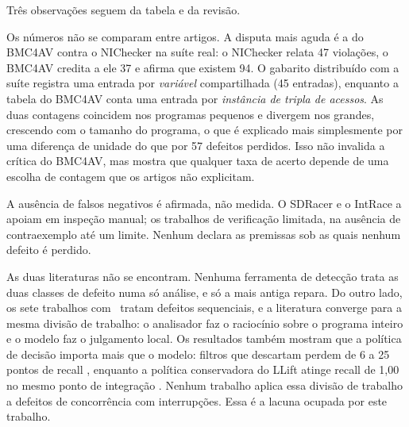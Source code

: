 Três observações seguem da tabela e da revisão.

Os números não se comparam entre artigos. A disputa mais aguda é a do
BMC4AV contra o NIChecker na suíte real: o NIChecker relata 47 violações, o
BMC4AV credita a ele 37 e afirma que existem 94. O gabarito
distribuído com a suíte registra uma entrada por \textit{variável} compartilhada
(45 entradas), enquanto a tabela do BMC4AV conta uma entrada por
\textit{instância de tripla de acessos}. As duas contagens coincidem nos
programas pequenos e divergem nos grandes, crescendo com o tamanho do programa, o que é explicado mais simplesmente por uma diferença de unidade do que
por 57 defeitos perdidos. Isso não invalida a crítica do BMC4AV, mas mostra que
qualquer taxa de acerto depende de uma escolha de contagem que os artigos não
explicitam.

A ausência de falsos negativos é afirmada, não medida. O SDRacer e o IntRace a apoiam em inspeção manual; os trabalhos de verificação limitada, na ausência de
contraexemplo até um limite. Nenhum declara as premissas sob as quais nenhum
defeito é perdido.

As duas literaturas não se encontram. Nenhuma ferramenta de detecção
trata as duas classes de defeito numa só análise, e só a mais antiga repara. Do
outro lado, os sete trabalhos com \llm\ tratam defeitos sequenciais, e a literatura converge para a mesma divisão de trabalho: o analisador faz o raciocínio sobre o
programa inteiro e o modelo faz o julgamento local. Os resultados também
mostram que a política de decisão importa mais que o modelo: filtros que
descartam perdem de 6 a 25 pontos de recall \cite{reducing-fp,adataint},
enquanto a política conservadora do LLift atinge recall de 1,00 no mesmo ponto
de integração \cite{llift}. Nenhum trabalho aplica essa divisão de trabalho a
defeitos de concorrência com interrupções. Essa é a lacuna ocupada por este
trabalho.
